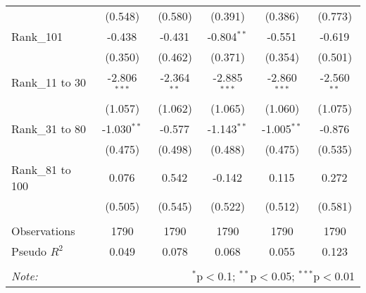 \begin{table}[!htbp]
\begin{tabular}{@{\extracolsep{5pt}}lccccc}
& (0.548) & (0.580) & (0.391) & (0.386) & (0.773) \\
 Rank_101 & -0.438$^{}$ & -0.431$^{}$ & -0.804$^{**}$ & -0.551$^{}$ & -0.619$^{}$ \\
& (0.350) & (0.462) & (0.371) & (0.354) & (0.501) \\
 Rank_11 to 30 & -2.806$^{***}$ & -2.364$^{**}$ & -2.885$^{***}$ & -2.860$^{***}$ & -2.560$^{**}$ \\
& (1.057) & (1.062) & (1.065) & (1.060) & (1.075) \\
 Rank_31 to 80 & -1.030$^{**}$ & -0.577$^{}$ & -1.143$^{**}$ & -1.005$^{**}$ & -0.876$^{}$ \\
& (0.475) & (0.498) & (0.488) & (0.475) & (0.535) \\
 Rank_81 to 100 & 0.076$^{}$ & 0.542$^{}$ & -0.142$^{}$ & 0.115$^{}$ & 0.272$^{}$ \\
& (0.505) & (0.545) & (0.522) & (0.512) & (0.581) \\
\hline \\[-1.8ex]
 Observations & 1790 & 1790 & 1790 & 1790 & 1790 \\
 Pseudo $R^2$ & 0.049 & 0.078 & 0.068 & 0.055 & 0.123 \\
\hline
\hline \\[-1.8ex]
\textit{Note:} & \multicolumn{5}{r}{$^{*}$p$<$0.1; $^{**}$p$<$0.05; $^{***}$p$<$0.01} \\
\end{tabular}
\end{table}